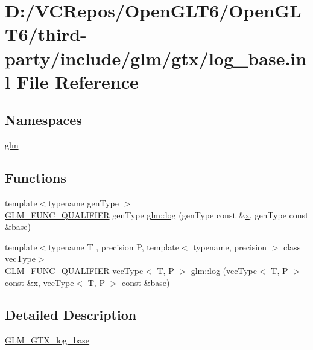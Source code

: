 \hypertarget{log__base_8inl}{}\section{D\+:/\+V\+C\+Repos/\+Open\+G\+L\+T6/\+Open\+G\+L\+T6/third-\/party/include/glm/gtx/log\+\_\+base.inl File Reference}
\label{log__base_8inl}
\subsection*{Namespaces}
\begin{DoxyCompactItemize}
\item 
 \mbox{\hyperlink{namespaceglm}{glm}}
\end{DoxyCompactItemize}
\subsection*{Functions}
\begin{DoxyCompactItemize}
\item 
{\footnotesize template$<$typename gen\+Type $>$ }\\\mbox{\hyperlink{setup_8hpp_a33fdea6f91c5f834105f7415e2a64407}{G\+L\+M\+\_\+\+F\+U\+N\+C\+\_\+\+Q\+U\+A\+L\+I\+F\+I\+ER}} gen\+Type \mbox{\hyperlink{group__gtx__log__base_ga60a7b0a401da660869946b2b77c710c9}{glm\+::log}} (gen\+Type const \&\mbox{\hyperlink{glad_8h_a92d0386e5c19fb81ea88c9f99644ab1d}{x}}, gen\+Type const \&base)
\item 
{\footnotesize template$<$typename T , precision P, template$<$ typename, precision $>$ class vec\+Type$>$ }\\\mbox{\hyperlink{setup_8hpp_a33fdea6f91c5f834105f7415e2a64407}{G\+L\+M\+\_\+\+F\+U\+N\+C\+\_\+\+Q\+U\+A\+L\+I\+F\+I\+ER}} vec\+Type$<$ T, P $>$ \mbox{\hyperlink{namespaceglm_a34910ffc6f0455ba14d6a0c4c75b0607}{glm\+::log}} (vec\+Type$<$ T, P $>$ const \&\mbox{\hyperlink{glad_8h_a92d0386e5c19fb81ea88c9f99644ab1d}{x}}, vec\+Type$<$ T, P $>$ const \&base)
\end{DoxyCompactItemize}


\subsection{Detailed Description}
\mbox{\hyperlink{group__gtx__log__base}{G\+L\+M\+\_\+\+G\+T\+X\+\_\+log\+\_\+base}} 